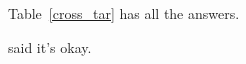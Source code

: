 \documentclass[12pt]{article}
\begin{document}
Table~\ref{cross_tar} has all the answers. 
\citep{Achen:1978} 


\citet{Achen:1978} said it's okay. 



\newpage
\singlespacing
\section*{}


\end{document}
